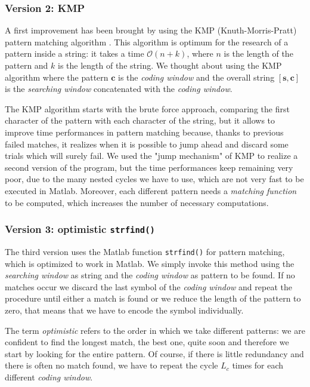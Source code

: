 \subsubsection{Version 2: KMP}
A first improvement has been brought by using the KMP (Knuth-Morris-Pratt) pattern matching algorithm \cite{knuth1}. This algorithm is optimum for the research of a pattern inside a string: it takes a time $\mathcal{O}(n + k)$, where $n$ is the length of the pattern and $k$ is the length of the string. We thought about using the KMP algorithm where the pattern $\mathbf{c}$ is the \textit{coding window} and the overall string $[\mathbf{s}, \mathbf{c}]$ is the \textit{searching window} concatenated with the \textit{coding window}.

The KMP algorithm starts with the brute force approach, comparing the first character of the pattern with each character of the string, but it allows to improve time performances in pattern matching because, thanks to previous failed matches, it realizes when it is possible to jump ahead and discard some trials which will surely fail. We used the "jump mechanism" of KMP to realize a second version of the program, but the time performances keep remaining very poor, due to the many nested cycles we have to use, which are not very fast to be executed in Matlab. Moreover, each different pattern needs a \textit{matching function} to be computed, which increases the number of necessary computations.

\subsubsection{Version 3: optimistic \texttt{strfind()}}
The third version uses the Matlab function \texttt{strfind()} for pattern matching, which is optimized to work in Matlab. We simply invoke this method using the \textit{searching window} as string and the \textit{coding window} as pattern to be found. If no matches occur we discard the last symbol of the \textit{coding window} and repeat the procedure until either a match is found or we reduce the length of the pattern to zero, that means that we have to encode the symbol individually.

The term \textit{optimistic} refers to the order in which we take different patterns: we are confident to find the longest match, the best one, quite soon and therefore we start by looking for the entire pattern. Of course, if there is little redundancy and there is often no match found, we have to repeat the cycle $L_c$ times for each different \textit{coding window}.

